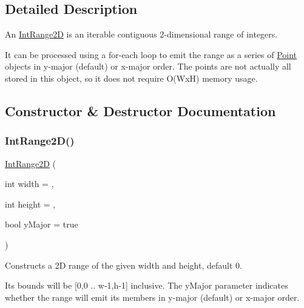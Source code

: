 \subsection{Detailed Description}
An \mbox{\hyperlink{classIntRange2D}{Int\+Range2D}} is an iterable contiguous 2-\/dimensional range of integers. 

It can be processed using a for-\/each loop to emit the range as a series of \mbox{\hyperlink{classPoint}{Point}} objects in y-\/major (default) or x-\/major order. The points are not actually all stored in this object, so it does not require O(\+Wx\+H) memory usage. 

\subsection{Constructor \& Destructor Documentation}
\mbox{\label{classIntRange2D_a39f2016ab50300a0d0e76d60fe958356}} 
\subsubsection{\texorpdfstring{Int\+Range2\+D()}{IntRange2D()}\hspace{0.1cm}{\footnotesize\ttfamily [1/2]}}
{\footnotesize\ttfamily \mbox{\hyperlink{classIntRange2D}{Int\+Range2D}} (\begin{DoxyParamCaption}\item[{int}]{width = {},  }\item[{int}]{height = {},  }\item[{bool}]{y\+Major = {\ttfamily true} }\end{DoxyParamCaption})}



Constructs a 2D range of the given width and height, default 0. 

Its bounds will be \mbox{[}0,0 .. w-\/1,h-\/1\mbox{]} inclusive. The y\+Major parameter indicates whether the range will emit its members in y-\/major (default) or x-\/major order. \mbox{\label{classIntRange2D_a22f22b7ce16863ba7acc111a2b26018b}} 
